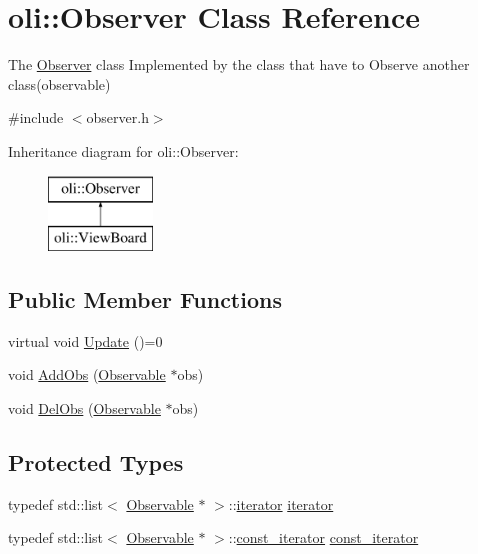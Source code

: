 \hypertarget{classoli_1_1_observer}{}\section{oli\+:\+:Observer Class Reference}
\label{classoli_1_1_observer}


The \hyperlink{classoli_1_1_observer}{Observer} class Implemented by the class that have to Observe another class(observable)  




{\ttfamily \#include $<$observer.\+h$>$}

Inheritance diagram for oli\+:\+:Observer\+:\begin{figure}[H]
\begin{center}
\leavevmode
\includegraphics[height=2.000000cm]{classoli_1_1_observer}
\end{center}
\end{figure}
\subsection*{Public Member Functions}
\begin{DoxyCompactItemize}
\item 
virtual void \hyperlink{classoli_1_1_observer_a81154a42166f88a6e341909438a07b75}{Update} ()=0
\item 
void \hyperlink{classoli_1_1_observer_a3d6dbe2f29de6f9aa33fcabe7d42d90c}{Add\+Obs} (\hyperlink{classoli_1_1_observable}{Observable} $\ast$obs)
\item 
void \hyperlink{classoli_1_1_observer_af34e52ebb941e7be3c1f1decd4299548}{Del\+Obs} (\hyperlink{classoli_1_1_observable}{Observable} $\ast$obs)
\end{DoxyCompactItemize}
\subsection*{Protected Types}
\begin{DoxyCompactItemize}
\item 
typedef std\+::list$<$ \hyperlink{classoli_1_1_observable}{Observable} $\ast$ $>$\+::\hyperlink{classoli_1_1_observer_a845b9aed78746c4f413cdeae346ca1b3}{iterator} \hyperlink{classoli_1_1_observer_a845b9aed78746c4f413cdeae346ca1b3}{iterator}
\item 
typedef std\+::list$<$ \hyperlink{classoli_1_1_observable}{Observable} $\ast$ $>$\+::\hyperlink{classoli_1_1_observer_a1b49363f9c8afdb6734aa28d685579ef}{const\+\_\+iterator} \hyperlink{classoli_1_1_observer_a1b49363f9c8afdb6734aa28d685579ef}{const\+\_\+iterator}
\end{DoxyCompactItemize}
